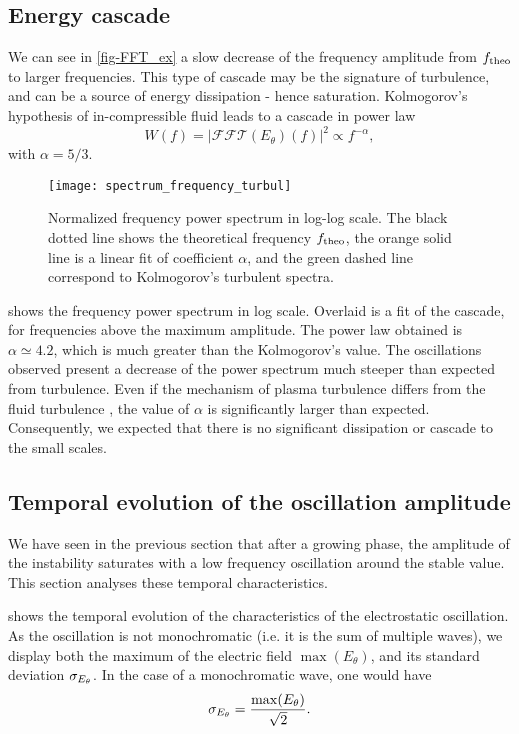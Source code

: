   \subsection{Energy cascade} \label{subsec-turbul}
  
  We can see in \cref{fig-FFT_ex} a slow decrease of the frequency amplitude from $f_{\rm theo}$ to larger frequencies.
  This type of cascade may be the signature of turbulence, and can be a source of energy dissipation - hence saturation.
  Kolmogorov's hypothesis of in-compressible fluid leads to a cascade in power law \[ W(f) = | \mathcal{FFT}(E_{\theta})(f) |^2 \propto f ^ {- \alpha}, \]
  with $\alpha = 5/3$.
  \begin{figure}[!hbt]
    \centering
    \texttt{[image: spectrum\_frequency\_turbul]}
    \caption{Normalized frequency power spectrum in log-log scale. The black dotted line shows the  theoretical frequency $f_{\rm theo}$, the orange solid line is a linear fit of coefficient $\alpha$, and the green dashed line correspond to Kolmogorov's turbulent spectra. }
    \label{fig-turbul}
  \end{figure}
  
   shows the frequency power spectrum in log scale.
  Overlaid is a fit of the cascade, for frequencies above the maximum amplitude.
  The power law obtained is $\alpha \simeq 4.2$, which is much greater than the Kolmogorov's value.
  The oscillations observed present a decrease of the power spectrum much steeper than expected from turbulence.
  Even if the mechanism of plasma turbulence differs from the fluid turbulence \citep{tsytovich1972}, the value of $\alpha$ is significantly larger than expected.
  Consequently, we expected that there is no significant dissipation or cascade to the small scales.
  
  \subsection{Temporal evolution of the oscillation amplitude} \label{subsec-temp}
  We have seen in the previous section that after a growing phase, the amplitude of the instability saturates with a low frequency oscillation around the stable value.
  This section analyses these temporal characteristics.
  
   shows the temporal evolution of the characteristics of the electrostatic oscillation.
  As the oscillation is not monochromatic (i.e. it is the sum of multiple waves), we display both the maximum of the electric field $\max(E_{\theta})$, and its standard deviation $\sigma_{E_{\theta}}$.
  In the case of a monochromatic wave, one would have 
  \[ \sigma_{E_{\theta}} = \frac{\max(E_{\theta})}{\sqrt{2}}.  \]
  
